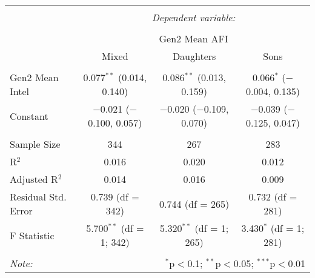 
\begingroup 
\small 
\begin{tabular}{@{\extracolsep{1pt}}lccc} 
\\[-1.8ex]\hline 
\hline \\[-1.8ex] 
 & \multicolumn{3}{c}{\textit{Dependent variable:}} \\ 
\cline{2-4} 
\\[-1.8ex] & \multicolumn{3}{c}{Gen2 Mean AFI} \\ 
 & Mixed & Daughters & Sons \\ 
\hline \\[-1.8ex] 
 Gen2 Mean Intel & 0.077$^{**}$ (0.014, 0.140) & 0.086$^{**}$ (0.013, 0.159) & 0.066$^{*}$ ($-$0.004, 0.135) \\ 
  Constant & $-$0.021 ($-$0.100, 0.057) & $-$0.020 ($-$0.109, 0.070) & $-$0.039 ($-$0.125, 0.047) \\ 
 \hline \\[-1.8ex] 
Sample Size & 344 & 267 & 283 \\ 
R$^{2}$ & 0.016 & 0.020 & 0.012 \\ 
Adjusted R$^{2}$ & 0.014 & 0.016 & 0.009 \\ 
Residual Std. Error & 0.739 (df = 342) & 0.744 (df = 265) & 0.732 (df = 281) \\ 
F Statistic & 5.700$^{**}$ (df = 1; 342) & 5.320$^{**}$ (df = 1; 265) & 3.430$^{*}$ (df = 1; 281) \\ 
\hline 
\hline \\[-1.8ex] 
\textit{Note:}  & \multicolumn{3}{r}{$^{*}$p$<$0.1; $^{**}$p$<$0.05; $^{***}$p$<$0.01} \\ 
\end{tabular} 
\endgroup 
